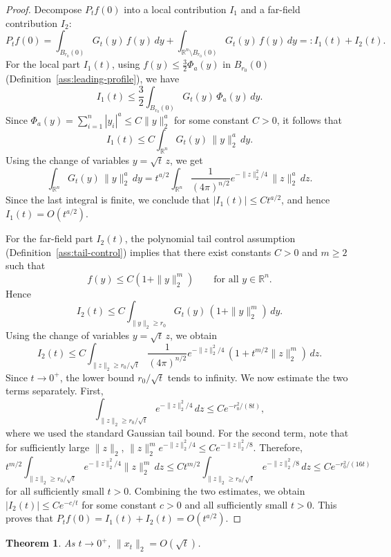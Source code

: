 \documentclass{article}
\newtheorem{theorem}{Theorem}[section]
\begin{document}
\begin{proof}
Decompose $P_t f(0)$ into a local contribution $I_1$ and a far-field contribution $I_2$:
$$P_t f(0)=\int_{B_{r_0}(0)} G_t(y)\,f(y)\,dy+\int_{\mathbb R^n\setminus B_{r_0}(0)} G_t(y)\,f(y)\,dy=:I_1(t)+I_2(t).$$
For the local part $I_1(t)$, using $f(y)\le \frac{3}{2}\Phi_a(y)$ in $B_{r_0}(0)$ (Definition~\ref{ass:leading-profile}), we have
$$I_1(t)\le \frac{3}{2}\int_{B_{r_0}(0)} G_t(y)\,\Phi_a(y)\,dy.$$
Since $\Phi_a(y)=\sum_{i=1}^n |y_i|^a\le C\|y\|_2^a$ for some constant $C>0$, it follows that
$$I_1(t)\le C\int_{\mathbb R^n} G_t(y)\,\|y\|_2^a\,dy.$$
Using the change of variables $y=\sqrt t\,z$, we get
$$\int_{\mathbb R^n} G_t(y)\,\|y\|_2^a\,dy=t^{a/2}\int_{\mathbb R^n}\frac{1}{(4\pi)^{n/2}}e^{-\|z\|_2^2/4}\,\|z\|_2^a\,dz.$$
Since the last integral is finite, we conclude that $|I_1(t)|\le Ct^{a/2}$, and hence $I_1(t)=O(t^{a/2})$.

For the far-field part $I_2(t)$, the polynomial tail control assumption (Definition~\ref{ass:tail-control}) implies that there exist constants $C>0$ and $m\ge 2$ such that
$$f(y)\le C(1+\|y\|_2^m)\qquad \text{for all } y\in\mathbb R^n.$$
Hence
$$I_2(t)\le C\int_{\|y\|_2\ge r_0} G_t(y)\,(1+\|y\|_2^m)\,dy.$$
Using the change of variables $y=\sqrt{t}\,z$, we obtain
$$I_2(t)\le C\int_{\|z\|_2\ge r_0/\sqrt{t}} \frac{1}{(4\pi)^{n/2}}e^{-\|z\|_2^2/4}\,(1+t^{m/2}\|z\|_2^m)\,dz.$$
Since $t\to0^+$, the lower bound $r_0/\sqrt{t}$ tends to infinity. We now estimate the two terms separately. First,
\begin{equation}\label{eq:gaussian_tail}
    \int_{\|z\|_2\ge r_0/\sqrt{t}} e^{-\|z\|_2^2/4}\,dz
\le C e^{-r_0^2/(8t)},
\end{equation}
where we used the standard Gaussian tail bound. For the second term, note that for sufficiently large $\|z\|_2$, $\|z\|_2^m e^{-\|z\|_2^2/4}\le C e^{-\|z\|_2^2/8}$. Therefore,
$$t^{m/2}\int_{\|z\|_2\ge r_0/\sqrt{t}} e^{-\|z\|_2^2/4}\|z\|_2^m\,dz\le C t^{m/2}\int_{\|z\|_2\ge r_0/\sqrt{t}} e^{-\|z\|_2^2/8}\,dz\le C e^{-r_0^2/(16t)}$$
for all sufficiently small $t>0$. Combining the two estimates, we obtain $|I_2(t)|\le C e^{-c/t}$ for some constant $c>0$ and all sufficiently small $t>0$. This proves that $P_t f(0)=I_1(t)+I_2(t)=O(t^{a/2})$.
\end{proof}

\begin{theorem}\label{thm:existence-localization} As $t\to0^+$, 
$\|x_t\|_2=O(\sqrt t)$.

\end{theorem}
\end{document}
